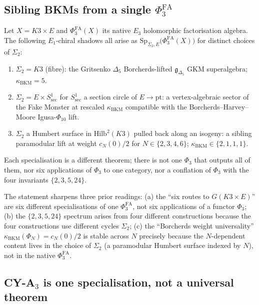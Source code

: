 \subsection{Sibling BKMs from a single $\Phi^{\mathrm{FA}}_3$}

\begin{corollary}
\label{cor:many-BKMs}
Let $X=K3\times E$ and $\Phi^{\mathrm{FA}}_3(X)$ its native $E_3$
holomorphic factorisation algebra. The following $E_1$-chiral
shadows all arise as $\mathrm{Sp}_{\Sigma_2,E}\bigl(\Phi^{\mathrm{FA}}_3(X)\bigr)$
for distinct choices of $\Sigma_2$:
\begin{enumerate}
\item $\Sigma_2=K3$ (fibre): the Gritsenko $\Delta_5$ Borcherds-lifted
$\mathfrak{g}_{\Delta_5}$ GKM superalgebra; $\kappa_{\mathrm{BKM}}=5$.
\item $\Sigma_2=E\times S^1_{\mathrm{sec}}$ for $S^1_{\mathrm{sec}}$ a
section circle of $E\to\mathrm{pt}$: a vertex-algebraic sector of the
Fake Monster at rescaled $\kappa_{\mathrm{BKM}}$ compatible with the
Borcherds--Harvey--Moore Igusa-$\Phi_{10}$ lift.
\item $\Sigma_2$ a Humbert surface in $\mathrm{Hilb}^2(K3)$ pulled back
along an isogeny: a sibling paramodular lift at weight $c_N(0)/2$ for
$N\in\{2,3,4,6\}$; $\kappa_{\mathrm{BKM}}\in\{2,1,1,1\}$.
\end{enumerate}
Each specialisation is a different theorem; there is not one $\Phi_3$
that outputs all of them, nor six applications of $\Phi_3$ to one
category, nor a conflation of $\Phi_3$ with the four invariants
$\{2,3,5,24\}$.
\end{corollary}

The statement sharpens three prior readings: (a) the ``six routes to
$G(K3\times E)$'' are six different specialisations of one
$\Phi^{\mathrm{FA}}_3$, not six applications of a functor $\Phi_3$; (b)
the $\{2,3,5,24\}$ spectrum arises from four different constructions
because the four constructions use different cycles $\Sigma_2$; (c) the
``Borcherds weight universality'' $\kappa_{\mathrm{BKM}}(\Phi_N)=c_N(0)/2$
is stable across $N$ precisely because the $N$-dependent content lives in
the choice of $\Sigma_2$ (a paramodular Humbert surface indexed by $N$),
not in the native $\Phi^{\mathrm{FA}}_3$.

\subsection{CY-A$_3$ is one specialisation, not a universal theorem}

